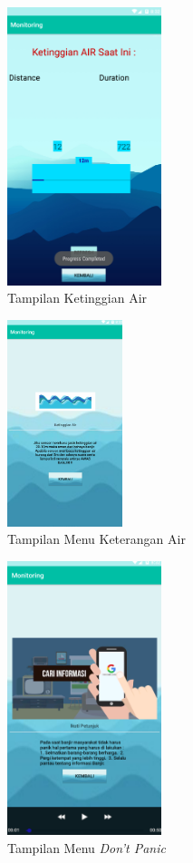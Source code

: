 \begin{figure}[H]
        \centering
        \includegraphics[width=0.4\textwidth]{figures/empat.png}
        \caption{Tampilan Ketinggian Air}
        \label{print}
        \end{figure}
\begin{figure}[H]
        \centering
        \includegraphics[width=0.3\textwidth]{figures/lima.png}
        \caption{Tampilan Menu Keterangan Air}
        \label{print}
        \end{figure}
\begin{figure}[H]
        \centering
        \includegraphics[width=0.4\textwidth]{figures/enam.png}
        \caption{Tampilan Menu \textit{Don't Panic}}
        \label{print}
        \end{figure}

